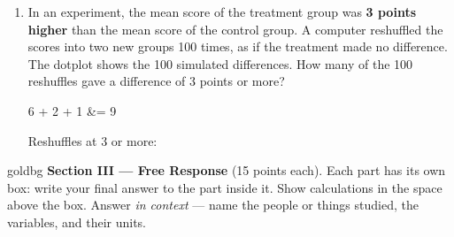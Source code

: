 \documentclass[12pt]{article}
\begin{document}
\begin{enumerate}[leftmargin=1.9em, itemsep=0.16in, resume]
  \boxguard[20]
  \item In an experiment, the mean score of the treatment group was \textbf{3 points higher}
        than the mean score of the control group. A computer reshuffled the scores into two new
        groups 100 times, as if the treatment made no difference. The dotplot shows the 100
        simulated differences. How many of the 100 reshuffles gave a difference of 3 points or
        more?
        \begin{center}
        \end{center}
        \vspace{-6pt}
        \begin{work}
          6 + 2 + 1 &= 9
        \end{work}
        \hfill Reshuffles at 3 or more:~\gradedblank[id=t25, type=short, points=3, answer=9, check=numeric]{1.1in}{0.34in}

\end{enumerate}

\vspace{0.14in}

\boxguard[34]
\begin{headlinebox}{goldbg}
\small
\textbf{Section III --- Free Response} (15 points each). Each part has its own box: write your
final answer to the part inside it. Show calculations in the space above the box. Answer
\emph{in context} --- name the people or things studied, the variables, and their units.
\end{headlinebox}

\vspace{0.10in}
\end{document}
